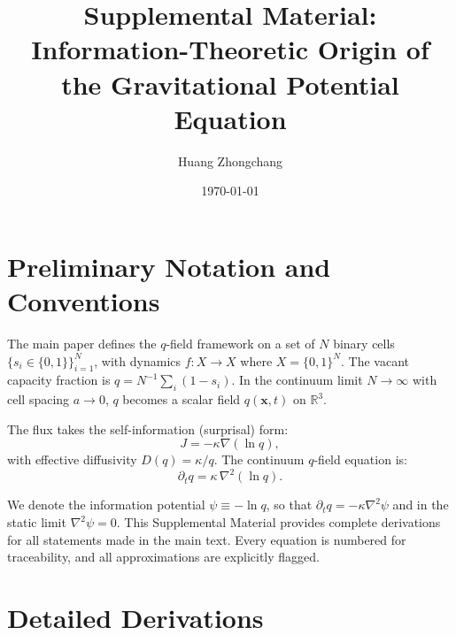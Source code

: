 \documentclass[reprint]{revtex4-2}
\begin{document}
\title{Supplemental Material:\\
Information-Theoretic Origin of the Gravitational Potential Equation}

\author{Huang Zhongchang}

\date{\today}

\maketitle
\tableofcontents

\section{Preliminary Notation and Conventions}

The main paper defines the $q$-field framework on a set of $N$ binary cells $\{s_i\in\{0,1\}\}_{i=1}^N$, with dynamics $f:X\to X$ where $X=\{0,1\}^N$. The vacant capacity fraction is $q=N^{-1}\sum_i(1-s_i)$. In the continuum limit $N\to\infty$ with cell spacing $a\to 0$, $q$ becomes a scalar field $q(\mathbf{x},t)$ on $\mathbb{R}^3$.

The flux takes the self-information (surprisal) form:
\begin{equation}
J = -\kappa\nabla(\ln q),
\end{equation}
with effective diffusivity $D(q)=\kappa/q$. The continuum $q$-field equation is:
\begin{equation}
\boxed{\partial_t q = \kappa\,\nabla^2(\ln q)}.
\end{equation}

We denote the information potential $\psi\equiv -\ln q$, so that $\partial_t q = -\kappa\nabla^2\psi$ and in the static limit $\nabla^2\psi=0$. This Supplemental Material provides complete derivations for all statements made in the main text. Every equation is numbered for traceability, and all approximations are explicitly flagged.

\section{Detailed Derivations}

\end{document}
